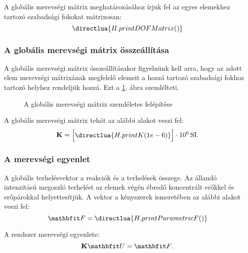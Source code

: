 A globális merevségi mátrix meghatározásához írjuk fel az egyes elemekhez
tartozó szabadsági fokokat mátrixosan:
\begin{equation}
  \directlua{H.printDOFMatrix()}
  \label{eq:DOF}
\end{equation}

\subsubsection{A globális merevségi mátrix összeállítása}

A globális merevségi mátrix összeállításakor figyelnünk kell arra, hogy az adott
elem merevségi mátrixának megfelelő elemeit a hozzá tartozó szabadsági fokhoz
tartozó helyhez rendeljük hozzá. Ezt a \ref{fig:K}. ábra szemlélteti.
\begin{figure}[H]
  \centering
  
  \caption{A globális merevségi mátrix szemléletes felépítése}
  \label{fig:K}
\end{figure}

A globális merevségi mátrix tehát az alábbi alakot veszi fel:
\begin{equation}
  \siplaces{3}
  \rmat K = \begin{bmatrix}
    \directlua{H.printK(1e-6)}
  \end{bmatrix} \cdot 10^6 \, \mathrm{SI}
  \text.
  \label{eq:K}
\end{equation}

\subsubsection{A merevségi egyenlet}

A globális terhelésvektor a reakciók és a terhelések összege. Az állandó
intenzitású megoszló terhelést az elemek végén ébredő koncentrált erőkkel
és erőpárokkal helyettesítjük. A vektor a kényszerek ismeretében az alábbi
alakot veszi fel:
\begin{equation}
  \def\arraystretch{1.2}
  \rvec{F} =
  \directlua{H.printParametricF()}
  \label{eq:F-param}
\end{equation}

A rendszer merevségi egyenlete:
\begin{equation}
  \rmat K \rvec U = \rvec F
  \text.
  \label{eq:KUF}
\end{equation}

